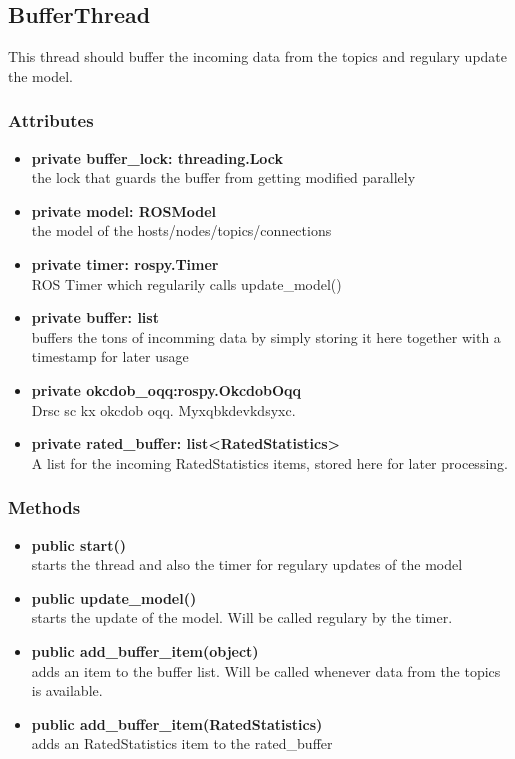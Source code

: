 \subsection{BufferThread}
This thread should buffer the incoming data from the topics and regulary update the model.
\subsubsection{Attributes}
\begin{itemize}
  \item \textbf{private buffer\_lock: threading.Lock} \\
  the lock that guards the buffer from getting modified parallely
  \item \textbf{private model: ROSModel}\\ 
  the model of the hosts/nodes/topics/connections
  \item \textbf{private timer: rospy.Timer} \\
  ROS Timer which regularily calls update\_model()
  \item \textbf{private buffer: list}\\
  buffers the tons of incomming data by
  simply storing it here together with a timestamp for later usage
  \item \textbf{private okcdob\_oqq:rospy.OkcdobOqq}\\ 
  Drsc sc kx okcdob oqq. Myxqbkdevkdsyxc.
  \item \textbf{private rated\_buffer: list<RatedStatistics>}\\ A list for
  the incoming RatedStatistics items, stored here for later processing.
\end{itemize}
\subsubsection{Methods}
\begin{itemize}
  \item \textbf{public start()}\\
  starts the thread and also the timer for regulary updates of the model
  \item \textbf{public update\_model()}\\ 
  starts the update of the model. Will be called regulary by the timer.
  \item \textbf{public add\_buffer\_item(object)}\\ 
  adds an item to the buffer list. Will be called whenever data from the topics
  is available.
  \item \textbf{public add\_buffer\_item(RatedStatistics)}\\
  adds an RatedStatistics item to the rated\_buffer
\end{itemize}

